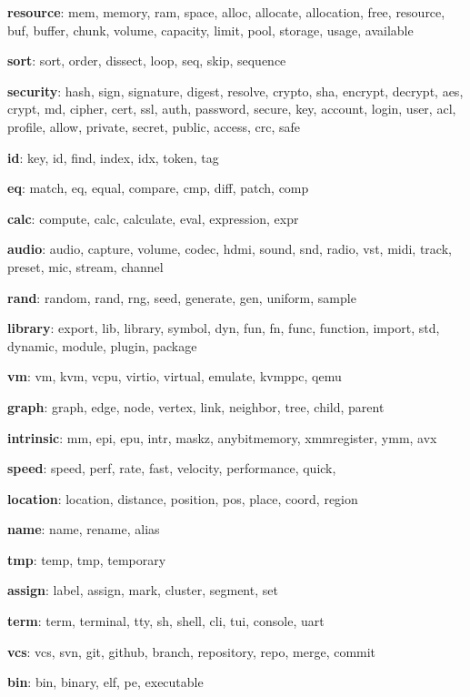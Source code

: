 \textbf{resource}: mem, memory, ram, space, alloc, allocate, allocation, free, resource, buf, buffer, chunk, volume, capacity, limit, pool, storage, usage, available

\textbf{sort}: sort, order, dissect, loop, seq, skip, sequence

\textbf{security}: hash, sign, signature, digest, resolve, crypto, sha, encrypt, decrypt, aes, crypt, md, cipher, cert, ssl, auth, password, secure, key, account, login, user, acl, profile, allow, private, secret, public, access, crc, safe

\textbf{id}: key, id, find, index, idx, token, tag

\textbf{eq}: match, eq, equal, compare, cmp, diff, patch, comp

\textbf{calc}: compute, calc, calculate, eval, expression, expr

\textbf{audio}: audio, capture, volume, codec, hdmi, sound, snd, radio, vst, midi, track, preset, mic, stream, channel

\textbf{rand}: random, rand, rng, seed, generate, gen, uniform, sample

\textbf{library}: export, lib, library, symbol, dyn, fun, fn, func, function, import, std, dynamic, module, plugin, package

\textbf{vm}: vm, kvm, vcpu, virtio, virtual, emulate, kvmppc, qemu

\textbf{graph}: graph, edge, node, vertex, link, neighbor, tree, child, parent

\textbf{intrinsic}: mm, epi, epu, intr, maskz, anybitmemory, xmmregister, ymm, avx

\textbf{speed}: speed, perf, rate, fast, velocity, performance, quick,

\textbf{location}: location, distance, position, pos, place, coord, region

\textbf{name}: name, rename, alias

\textbf{tmp}: temp, tmp, temporary

\textbf{assign}: label, assign, mark, cluster, segment, set

\textbf{term}: term, terminal, tty, sh, shell, cli, tui, console, uart

\textbf{vcs}: vcs, svn, git, github, branch, repository, repo, merge, commit

\textbf{bin}: bin, binary, elf, pe, executable